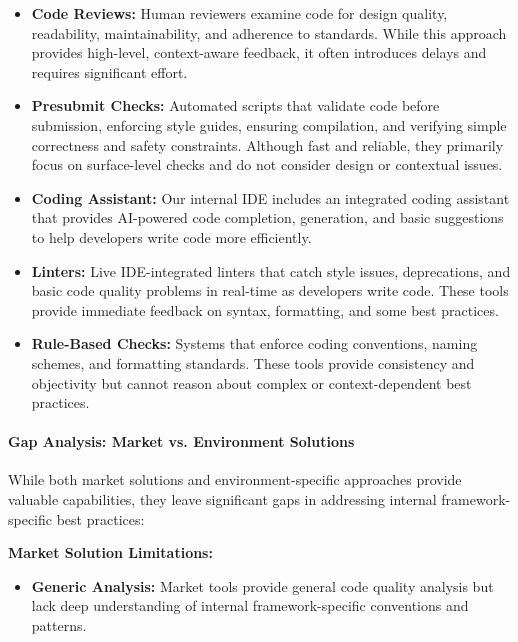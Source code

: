 \begin{spacing}{1.2}
\begin{itemize}    
    
    \item \textbf{Code Reviews:} Human reviewers examine code for design quality, readability, maintainability, and adherence to standards. While this approach provides high-level, context-aware feedback, it often introduces delays and requires significant effort.
    
    \item \textbf{Presubmit Checks:} Automated scripts that validate code before submission, enforcing style guides, ensuring compilation, and verifying simple correctness and safety constraints. Although fast and reliable, they primarily focus on surface-level checks and do not consider design or contextual issues.
    
    \item \textbf{Coding Assistant:} Our internal IDE includes an integrated coding assistant that provides AI-powered code completion, generation, and basic suggestions to help developers write code more efficiently.

    \item \textbf{Linters:} Live IDE-integrated linters that catch style issues, deprecations, and basic code quality problems in real-time as developers write code. These tools provide immediate feedback on syntax, formatting, and some best practices.

    \item \textbf{Rule-Based Checks:} Systems that enforce coding conventions, naming schemes, and formatting standards. These tools provide consistency and objectivity but cannot reason about complex or context-dependent best practices.
\end{itemize}

\paragraph{Gap Analysis: Market vs. Environment Solutions}

While both market solutions and environment-specific approaches provide valuable capabilities, they leave significant gaps in addressing internal framework-specific best practices:

\textbf{Market Solution Limitations:}
\begin{itemize}
    \item \textbf{Generic Analysis:} Market tools provide general code quality analysis but lack deep understanding of internal framework-specific conventions and patterns.
    

\end{itemize}
\end{spacing}

